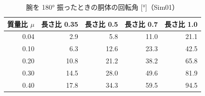 \begin{longtable}{rrrrr}
\caption{腕を 180° 振ったときの胴体の回転角 [°]（Sim01）}\\
\toprule
質量比 $\mu$ & 長さ比 0.35 & 長さ比 0.5 & 長さ比 0.7 & 長さ比 1.0 \\ \midrule \endhead
0.04 & 2.9 & 5.8 & 11.0 & 21.1 \\
0.10 & 6.3 & 12.6 & 23.3 & 42.5 \\
0.20 & 10.8 & 21.2 & 38.2 & 65.8 \\
0.30 & 14.5 & 28.0 & 49.6 & 81.9 \\
0.40 & 17.8 & 34.3 & 59.5 & 94.5 \\
\bottomrule
\end{longtable}
